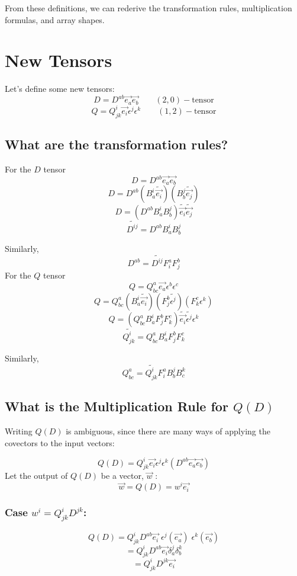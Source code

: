 \documentclass{report}
\begin{document}
From these definitions, we can rederive the transformation rules, multiplication formulas, and array shapes.

\section{New Tensors}
Let's define some new tensors:
$$ D = D^{ab} \vec{e_a} \vec{e_b} \qquad \left(2,0 \right)-\text{tensor} $$ 
$$ Q = Q_{jk}^i \vec{e_i} \epsilon^j \epsilon^k \qquad \left(1,2 \right)-\text{tensor} $$ 

\subsection{What are the transformation rules?}

For the $D$ tensor
$$D = D^{ab} \vec{e_a} \vec{e_b}$$
$$ D= D^{ab} \left( B_a^i \widetilde{\vec{e_i}} \right) \left( B_b^j \widetilde{\vec{e_j}} \right) $$ 
$$ D = \left(D^{ab} B_a^i B_b^j\right) \widetilde{\vec{e_i}} \widetilde{\vec{e_j}}  $$ 
$$ \widetilde{D^{ij}} = D^{ab} B_a^i B_b^j $$ 

Similarly,
$$ D^{ab} = \widetilde{D^{ij}} F_i^a F_j^b $$ 
For the $Q$ tensor
$$ Q = Q_{bc}^a \vec{e_a} \epsilon^b \epsilon^c $$ 
$$ Q = Q_{bc}^a \left( B_a^i \widetilde{\vec{e_i}} \right) \left( F_j^b \widetilde{\epsilon^j} \right) \left( F_k^c \epsilon^k \right) $$ 
$$ Q = \left(Q_{bc}^a  B_a^i F_j^b F_k^c\right) \widetilde{\vec{e_i}} \widetilde{\epsilon^j} \epsilon^k $$ 
$$ \widetilde{Q_{jk}^i}  = Q_{bc}^a B_a^i F_j^b F_k^c$$ 

Similarly,
$$ Q_{bc}^a  = \widetilde{Q_{jk}^i} F_i^a B_b^j B_c^k$$ 

\subsection{What is the Multiplication Rule for $Q(D)$}
Writing $Q(D)$ is ambiguous, since there are many ways of applying the covectors to the input vectors:

$$ Q(D) = Q_{jk}^i \vec{e_i}\epsilon^j\epsilon^k\left( D^{ab} \vec{e_a} \vec{e_b} \right) $$ 
Let the output of $Q(D)$ be a vector, $\vec{w}$ :
$$ \vec{w} = Q(D) = w^i \vec{e_i} $$ 

\subsubsection{Case $w^i = Q_{jk}^i D^{jk}$:}
$$ Q(D) = Q_{jk}^i D^{ab} \vec{e_i} \; \epsilon^j \left(\vec{e_a}   \right) \; \epsilon^k \left( \vec{e_b} \right) $$ 
$$ = Q_{jk}^i D^{ab} \vec{e_i} \delta_a^j \delta_b^k $$ 
$$ = Q_{jk}^i D^{jk} \vec{e_i} $$ 
\end{document}

